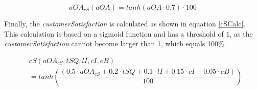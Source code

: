 \begin{equation}
\label{aOA_cS}
   aOA_{cS}(aOA) = tanh(aOA \cdot 0.7) \cdot 100
\end{equation}

Finally, the \textit{customerSatisfaction} is calculated as shown in equation \ref{cSCalc}. This calculation is based on a sigmoid function and has a threshold of $1$, as the \textit{customerSatisfaction} cannot become larger than 1, which equals 100\%.

\begin{equation}
\begin{aligned}
\label{cSCalc}
    & cS(aOA_{cS}, tSQ, lI, cI, eB) \\
    & = tanh(\dfrac{(0.5 \cdot aOA_{cS} + 0.2 \cdot tSQ + 0.1 \cdot lI + 0.15 \cdot cI + 0.05 \cdot eB)}{100})
\end{aligned}   
\end{equation}



\begin{comment}
Moreover, there are three main levels of customer requirements regarding products: Must haves, satisfiers and delighters. \cite{krienke_messung_2009}
Must haves are the bare minimum requirements expected of customers. The customers do not show exceptional appreciation for the must haves, but if they are not met, the customer will show dissatisfaction. Satisfiers are the requirements that the customer expressly wishes. If you offer better or more of these satisfiers, then the customers will appreciate it more and be more satisfied. Delighters are the extras or the add-ons. The lack of these characteristics will not make the customer dissatisfied but adding these would greatly increase the customer's satisfaction. In our game, these three levels of customer requirements are included by the following calculation of the customer satisfaction, which depends on a product's \textit{totalProductQuality}. This means, if the user chooses newer, better components for producing a product, then the product's \textit{totalProductQuality} will increase, which again influences the calculation of the customer satisfaction.
    \begin{equation}
    \label{cS_Calc}
    \begin{aligned}
    If \; tPQ \leq \ 40: (0,6*tPQ + 0,15*tSQ + 0,1*lI + 0,1*cI + 0,05*eB)\\
    ElseIf \; tPQ \leq \ 60: (0,5*tPQ + 0,2*tSQ + 0,1*lI + 0,15*cI + 0,05*eB)\\
    Else: (0,45*tPQ + 0,25*tSQ + 0,1*lI + 0,15*cI + 0,05*eB)
    \end{aligned}
    \end{equation}
Each line of the calculation \ref{cS_Calc} refers to one of the three main levels of customer requirements. So, the first line of the calculation refers to a product's must haves, the second line refers to satisfiers and the third line refers to the delighters level of the customer requirements.
Although the calculation \ref{cS_Calc} looks quite static, this is not the case as the variables, on which the calculation is based, are not static but change continuously.
\end{comment}
